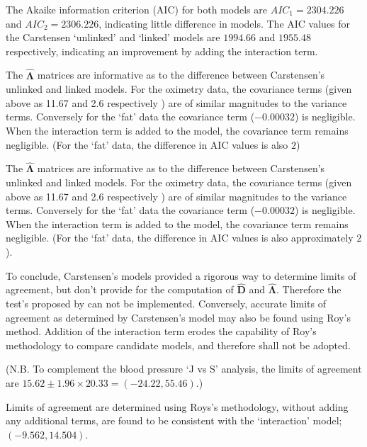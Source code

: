 \documentclass[12pt, a4paper]{report}
\theoremstyle{plain}
\theoremstyle{definition}
\theoremstyle{remark}
\begin{document}
The Akaike information criterion (AIC) for both models are $AIC_{1} = 2304.226$ and $AIC_{2} = 2306.226$, indicating little difference in models. The AIC values for the Carstensen `unlinked' and `linked' models are $1994.66$ and $1955.48$ respectively, indicating an improvement by adding the interaction term.


The $\boldsymbol{\hat{\Lambda}}$ matrices are informative as to the difference between Carstensen's unlinked and linked models. For the oximetry data, the covariance terms (given above as 11.67 and 2.6 respectively ) are of similar magnitudes to the variance terms. Conversely for the `fat' data the covariance term ($-0.00032$) is negligible. When the interaction term is added to the model, the covariance term remains negligible. (For the `fat' data, the difference in AIC values is also $2$)

The $\boldsymbol{\hat{\Lambda}}$ matrices are informative as to the difference between Carstensen's unlinked and linked models. For the oximetry data, the covariance terms (given above as 11.67 and 2.6 respectively ) are of similar magnitudes to the variance terms. Conversely for the `fat' data the covariance term ($-0.00032$) is negligible. When the interaction term is added to the model, the covariance term remains negligible. (For the `fat' data, the difference in AIC values is also approximately $2$).
	
To conclude, Carstensen's models provided a rigorous way to determine limits of agreement, but don't provide for the computation of $\boldsymbol{\hat{D}}$ and $\boldsymbol{\hat{\Lambda}}$. Therefore the test's proposed by \citet{roy} can not be implemented. Conversely, accurate limits of agreement as determined by Carstensen's model may also be found using Roy's method. Addition of the interaction term erodes the capability of Roy's methodology to compare candidate models, and therefore shall not be adopted.
	
(N.B. To complement the blood pressure `J vs S' analysis, the limits of agreement are $15.62 \pm 1.96 \times 20.33 = (-24.22, 55.46)$.)












Limits of agreement are determined using Roys's methodology, without adding any additional terms, are found to be consistent with the `interaction' model; $(-9.562, 14.504 )$. 
\end{document}
